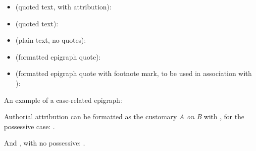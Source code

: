 \begin{itemize}\item {} (quoted text, with attribution):\end{itemize} \begin{quotation}\end{quotation}
\begin{itemize}\item{} (quoted text):\end{itemize} \begin{quotation}\end{quotation}
\begin{itemize}\item{} (plain text, no quotes): \end{itemize}\begin{quotation}\end{quotation}
\begin{itemize}\item{} (formatted epigraph quote): \end{itemize}\begin{quotation}\end{quotation}
\begin{itemize}\item{} (formatted epigraph quote with footnote mark, to be used in association with ):\end{itemize} \begin{quotation}\end{quotation}

\p An example of a case-related epigraph: \begin{quotation}\end{quotation}

\p {} Authorial attribution can be formatted as the customary \textit{A on B} with , for the possessive case: .

\p And , with no possessive: .

